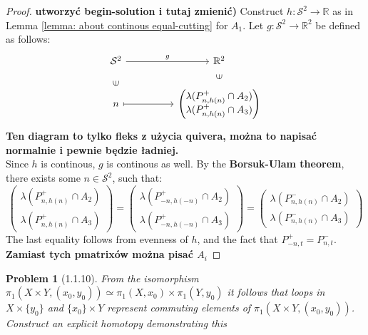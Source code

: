 \documentclass[11pt, a4paper, final]{amsart}
\newcommand{\R}{{\mathbb{R}}}
\newcommand\todo[1]{\textbf{\textcolor{redd}{#1}}}
\newcommand{\sphere}{\mathcal{S}}
\numberwithin{theorem}{section}
\newtheorem{problem}[theorem]{Problem}
\theoremstyle{definition}
\theoremstyle{remark}
\begin{document}
\begin{proof}\todo{utworzyć begin-solution i tutaj zmienić)}
    Construct $h : \sphere^2 \to \R$ as in Lemma \ref{lemma: about continous equal-cutting} for $A_1$.
    Let $g : \sphere^2 \to \R^2$ be defined as follows:
    \[\begin{tikzcd}
	{\sphere^2} && {\R^2} \\
	n && {\begin{pmatrix}
	    \lambda(P^+_{n, h(n)} \cap A_2) \\
        \lambda(P^+_{n, h(n)} \cap A_3)
	\end{pmatrix}}
	\arrow["g", from=1-1, to=1-3]
	\arrow["\in"{marking, allow upside down}, draw=none, from=2-1, to=1-1]
	\arrow[maps to, from=2-1, to=2-3]
	\arrow["\in"{marking, allow upside down}, draw=none, from=2-3, to=1-3]
\end{tikzcd}\]
\todo{Ten diagram to tylko fleks z użycia quivera, można to napisać normalnie i pewnie będzie ładniej.} \\
Since $h$ is continous, $g$ is continous as well. By the \textbf{Borsuk-Ulam theorem}, there exists some $n \in \sphere^2$, such that:
$$\begin{pmatrix}
	    \lambda(P^+_{n, h(n)} \cap A_2) \\
        \lambda(P^+_{n, h(n)} \cap A_3)
	\end{pmatrix} = \begin{pmatrix}
	    \lambda(P^+_{-n, h(-n)} \cap A_2) \\
        \lambda(P^+_{-n, h(-n)} \cap A_3)
	\end{pmatrix} = \begin{pmatrix}
	    \lambda(P^-_{n, h(n)} \cap A_2) \\
        \lambda(P^-_{n, h(n)} \cap A_3)
	\end{pmatrix}$$
    The last equality follows from evenness of $h$, and the fact that $P^+_{-n, t} = P^-_{n, t}$.
    \todo{Zamiast tych pmatrixów można pisać $A_i$}
\end{proof}

\begin{problem}[1.1.10]\label{problem: 1.1.10}
    From the isomorphism $\pi_1(X \times Y , (x_0, y_0)) \simeq \pi_1(X, x_0)\times \pi_1(Y , y_0)$ it follows that
    loops in $X \times \{y_0\}$ and $\{ x_0 \} \times Y$ represent commuting elements of $\pi_1
    (X \times Y , (x_0, y_0))$. Construct an explicit homotopy demonstrating this
\end{problem}
\end{document}

